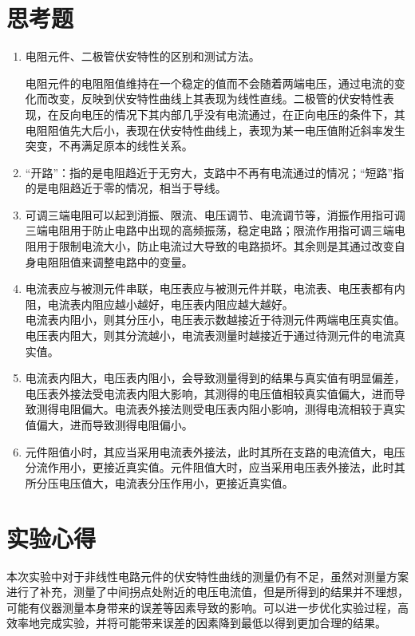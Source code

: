 \documentclass[a4paper]{article}
\begin{document}
\newpage
\section{思考题}
\begin{enumerate}
    \item 电阻元件、二极管伏安特性的区别和测试方法。\par 电阻元件的电阻阻值维持在一个稳定的值而不会随着两端电压，通过电流的变化而改变，反映到伏安特性曲线上其表现为线性直线。二极管的伏安特性表现，在反向电压的情况下其内部几乎没有电流通过，在正向电压的条件下，其电阻阻值先大后小，表现在伏安特性曲线上，表现为某一电压值附近斜率发生突变，不再满足原本的线性关系。
    \item “开路”：指的是电阻趋近于无穷大，支路中不再有电流通过的情况；“短路”指的是电阻趋近于零的情况，相当于导线。
    \item 可调三端电阻可以起到消振、限流、电压调节、电流调节等，消振作用指可调三端电阻用于防止电路中出现的高频振荡，稳定电路；限流作用指可调三端电阻用于限制电流大小，防止电流过大导致的电路损坏。其余则是其通过改变自身电阻阻值来调整电路中的变量。
    \item 电流表应与被测元件串联，电压表应与被测元件并联，电流表、电压表都有内阻，电流表内阻应越小越好，电压表内阻应越大越好。\\电流表内阻小，则其分压小，电压表示数越接近于待测元件两端电压真实值。电压表内阻大，则其分流越小，电流表测量时越接近于通过待测元件的电流真实值。
    \item 电流表内阻大，电压表内阻小，会导致测量得到的结果与真实值有明显偏差，电压表外接法受电流表内阻大影响，其测得的电压值相较真实值偏大，进而导致测得电阻偏大。电流表外接法则受电压表内阻小影响，测得电流相较于真实值偏大，进而导致测得电阻偏小。
    \item 元件阻值小时，其应当采用电流表外接法，此时其所在支路的电流值大，电压分流作用小，更接近真实值。元件阻值大时，应当采用电压表外接法，此时其所分压电压值大，电流表分压作用小，更接近真实值。
\end{enumerate}

\section{实验心得}
本次实验中对于非线性电路元件的伏安特性曲线的测量仍有不足，虽然对测量方案进行了补充，测量了中间拐点处附近的电压电流值，但是所得到的结果并不理想，可能有仪器测量本身带来的误差等因素导致的影响。可以进一步优化实验过程，高效率地完成实验，并将可能带来误差的因素降到最低以得到更加合理的结果。
\end{document}

